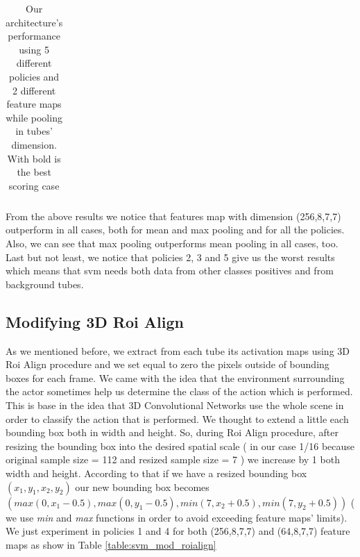 \documentclass{report}
\begin{document}
\begin{center}
\begin{longtable}{||c | c | c| c||c c c||}
  \caption{Our architecture's performance using 5 different policies and 2 different feature maps while pooling in
  tubes' dimension. With bold is the best scoring case}
  \label{table:svm_first_results}

\end{longtable} 
\end{center}

From the above results we notice that features map with dimension (256,8,7,7) outperform in all cases, both for mean and max pooling and
for all the policies. Also, we can see that max pooling outperforms mean pooling in all cases, too. Last but not least, we notice that policies
2, 3 and 5 give us the worst results which means that svm needs both data from other classes positives and from background tubes. 

\subsection{Modifying 3D Roi Align}
As we mentioned before, we extract from each tube its activation maps using 3D Roi Align procedure and we set equal to zero the pixels outside
of bounding boxes for each frame. We came with the idea that the environment surrounding the actor sometimes help us determine the class
of the action which is performed. This is base in the idea that 3D Convolutional Networks use the whole scene in order to classify the action
that is performed. We thought to extend a little each bounding box both in width and height. So, during Roi Align procedure, after resizing
the bounding box into the desired spatial scale  ( in our case 1/16 because original sample size = 112 and resized sample size = 7 )
we increase by 1 both width and height. According to that if we have a resized bounding box $( x_1,y_1,x_2,y_2) $ our new bounding box becomes
$ (max(0,x_1-0.5),max(0,y_1-0.5),min(7,x_2+0.5),min(7,y_2+0.5)) $ ( we use \textit{ min} and \textit{max} functions in order to avoid exceeding feature maps' limits).
We just experiment in policies 1 and 4 for both (256,8,7,7) and (64,8,7,7) feature maps as show in  Table \ref{table:svm_mod_roialign}
\end{document}
